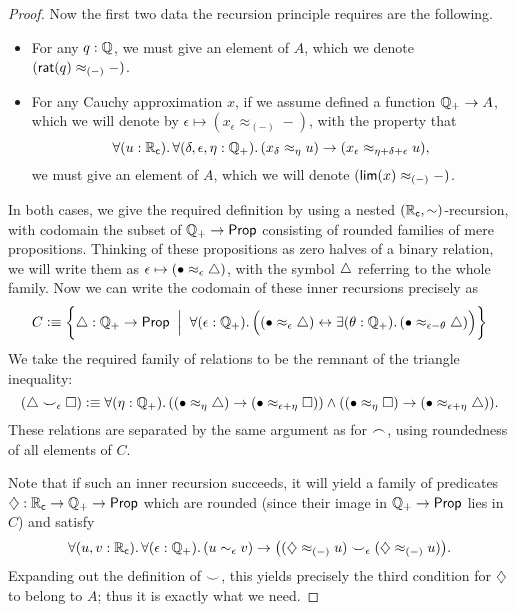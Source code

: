 \begin{proof}
  Now the first two data the recursion principle requires are the following.
  \begin{itemize}
  \item For any $q:\mathbb{Q}$, we must give an element of $A$, which we denote $(\mathsf{rat}(q)\approx_{(-)} -)$.
  \item For any Cauchy approximation $x$, if we assume defined a function $\mathbb{Q}_{+} \to A$, which we will denote by $\epsilon \mapsto (x_\epsilon \approx_{(-)} -)$, with the property that 
    \begin{equation}
      \fall{u:\RC}{\delta,\epsilon,\eta:\Qp} (x_\delta \approx_\eta u) \to (x_\epsilon \approx_{\eta+\delta+\epsilon} u),\label{eq:appxrec2}
    \end{equation}
    we must give an element of $A$, which we will denote $(\mathsf{lim}(x)\approx_{(-)} -)$.
  \end{itemize}
  In both cases, we give the required definition by using a nested $(\mathbb{R}_\mathsf{c},\mathord\sim)$-recursion, with codomain the subset of $\mathbb{Q}_{+}\to\mathsf{Prop}$ consisting of rounded families of mere propositions.
  Thinking of these propositions as zero halves of a binary relation, we will write them as $\epsilon \mapsto (\bullet\approx_{\epsilon}\triangle)$, with the symbol $\triangle$ referring to the whole family.
  Now we can write the codomain of these inner recursions precisely as
  \begin{equation*}
    C \defeq \bigg\{ \tapname :\Qp\to\prop \;\;\Big|\;\;
    \fall{\epsilon:\Qp} \Big((\tap\epsilon) \leftrightarrow \exis{\theta:\Qp} (\tap{\epsilon-\theta})\Big)\bigg\}
  \end{equation*}
  We take the required family of relations to be the remnant of the triangle inequality:
  \begin{equation*}
    (\tapname \bbsim_\epsilon \tapbname) \defeq
    \fall{\eta:\Qp} ((\tap\eta) \to (\tapb{\epsilon+\eta})) \land ((\tapb\eta) \to (\tap{\epsilon+\eta})).
  \end{equation*}
  These relations are separated by the same argument as for $\frown$, using roundedness of all elements of $C$.

  Note that if such an inner recursion succeeds, it will yield a family of predicates $\diamondsuit : \mathbb{R}_\mathsf{c}\to\mathbb{Q}_{+}\to \mathsf{Prop}$ which are rounded
(since their image in $\mathbb{Q}_{+}\to\mathsf{Prop}$ lies in $C$) and satisfy
  \[ \fall{u,v:\RC}{\epsilon:\Qp} (u\close\epsilon v) \to \big((\hapx_{(-)} u) \bbsim_\epsilon (\hapx_{(-)} u)\big). \]
  Expanding out the definition of $\smile$, this yields precisely the third condition for $\diamondsuit$ to belong to $A$; thus it is exactly what we need.


\end{proof}
